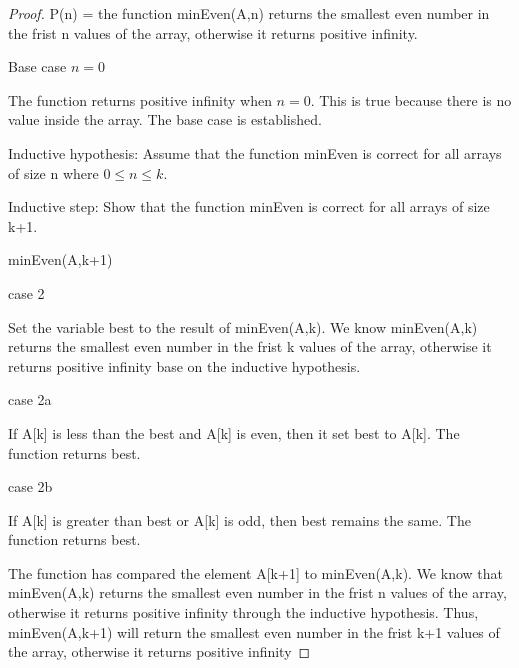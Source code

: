 \documentclass{article}
\begin{document}
    \begin{proof}
      P(n) = the function minEven(A,n) returns the smallest even number in the frist n values of the array, otherwise it
      returns positive infinity.

      Base case $n = 0$
      
      The function returns positive infinity when $n=0$. This is true because there is no value inside the array.
      The base case is established.

    Inductive hypothesis: Assume that the function minEven is correct for all arrays of size n where $0 \leq n \leq k.$
     
    Inductive step: Show that the function minEven is correct for all arrays of size k+1.
    
    minEven(A,k+1)

    case 2

    Set the variable best to the result of minEven(A,k). We know minEven(A,k) returns the smallest even number in the frist k values of the array, otherwise it
    returns positive infinity base on the inductive hypothesis.

    case 2a

    If A[k] is less than the best and A[k] is even, then it set best to A[k]. The function returns best.
    
    case 2b

    If A[k] is greater than best or A[k] is odd, then best remains the same. The function returns best. 

    The function has compared the element A[k+1] to minEven(A,k). We know that minEven(A,k) returns the smallest even number in the frist n values of the array, otherwise it
    returns positive infinity through the inductive hypothesis. Thus, minEven(A,k+1)
    will return the smallest even number in the frist k+1 values of the array, otherwise it
    returns positive infinity
  
  \end{proof}
\end{document}
